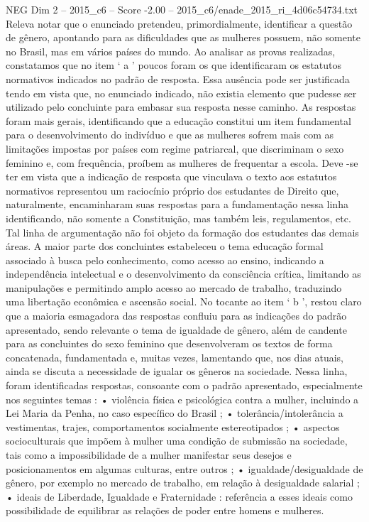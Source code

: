 \begin{textsample}{NEG Dim 2 – 2015\_c6 – Score -2.00 – 2015\_c6/enade\_2015\_ri\_4d06c54734.txt}
Releva notar que o enunciado pretendeu, primordialmente, identificar a questão de gênero, apontando para as dificuldades que as mulheres possuem, não somente no Brasil, mas em vários países do mundo.
Ao analisar as provas realizadas, constatamos que no item ‘ a ’ poucos foram os que identificaram os estatutos normativos indicados no padrão de resposta.
Essa ausência pode ser justificada tendo em vista que, no enunciado indicado, não existia elemento que pudesse ser utilizado pelo concluinte para embasar sua resposta nesse caminho.
As respostas foram mais gerais, identificando que a educação constitui um item fundamental para o desenvolvimento do indivíduo e que as mulheres sofrem mais com as limitações impostas por países com regime patriarcal, que discriminam o sexo feminino e, com frequência, proíbem as mulheres de frequentar a escola.
Deve -se ter em vista que a indicação de resposta que vinculava o texto aos estatutos normativos representou um raciocínio próprio dos estudantes de Direito que, naturalmente, encaminharam suas respostas para a fundamentação nessa linha identificando, não somente a Constituição, mas também leis, regulamentos, etc.
Tal linha de argumentação não foi objeto da formação dos estudantes das demais áreas.
A maior parte dos concluintes estabeleceu o tema educação formal associado à busca pelo conhecimento, como acesso ao ensino, indicando a independência intelectual e o desenvolvimento da consciência crítica, limitando as manipulações e permitindo amplo acesso ao mercado de trabalho, traduzindo uma libertação econômica e ascensão social.
No tocante ao item ‘ b ’, restou claro que a maioria esmagadora das respostas confluiu para as indicações do padrão apresentado, sendo relevante o tema de igualdade de gênero, além de candente para as concluintes do sexo feminino que desenvolveram os textos de forma concatenada, fundamentada e, muitas vezes, lamentando que, nos dias atuais, ainda se discuta a necessidade de igualar os gêneros na sociedade.
Nessa linha, foram identificadas respostas, consoante com o padrão apresentado, especialmente nos seguintes temas : • violência física e psicológica contra a mulher, incluindo a Lei Maria da Penha, no caso específico do Brasil ; • tolerância/intolerância a vestimentas, trajes, comportamentos socialmente estereotipados ; • aspectos socioculturais que impõem à mulher uma condição de submissão na sociedade, tais como a impossibilidade de a mulher manifestar seus desejos e posicionamentos em algumas culturas, entre outros ; • igualdade/desigualdade de gênero, por exemplo no mercado de trabalho, em relação à desigualdade salarial ; • ideais de Liberdade, Igualdade e Fraternidade : referência a esses ideais como possibilidade de equilibrar as relações de poder entre homens e mulheres.

\end{textsample}
